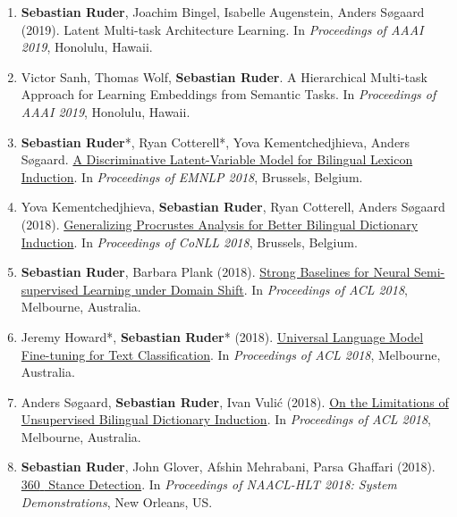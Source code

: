 \documentclass[10pt,letterpaper]{article}
\begin{document}
\begin{enumerate}
	\parskip=0.1em
	
	\item \textbf{Sebastian Ruder}, Joachim Bingel, Isabelle Augenstein, Anders Søgaard (2019). Latent Multi-task Architecture Learning. In \textit{Proceedings of AAAI 2019}, Honolulu, Hawaii.
	
	\item Victor Sanh, Thomas Wolf, \textbf{Sebastian Ruder}. A Hierarchical Multi-task Approach for Learning Embeddings from Semantic Tasks. In \textit{Proceedings of AAAI 2019}, Honolulu, Hawaii.
	
	\item \textbf{Sebastian Ruder}*, Ryan Cotterell*, Yova Kementchedjhieva, Anders Søgaard. \href{https://arxiv.org/abs/1808.09334}{A Discriminative Latent-Variable Model for Bilingual Lexicon Induction}. In \textit{Proceedings of EMNLP 2018}, Brussels, Belgium.

	\item Yova Kementchedjhieva, \textbf{Sebastian Ruder}, Ryan Cotterell, Anders Søgaard (2018). \href{https://arxiv.org/abs/1809.00064}{Generalizing Procrustes Analysis for Better Bilingual Dictionary Induction}. In \textit{Proceedings of CoNLL 2018}, Brussels, Belgium.
	
	\item \textbf{Sebastian Ruder}, Barbara Plank (2018). \href{https://arxiv.org/abs/1804.09530}{Strong Baselines for Neural Semi-supervised Learning under Domain Shift}. In \textit{Proceedings of ACL 2018}, Melbourne, Australia.

	\item Jeremy Howard*, \textbf{Sebastian Ruder}* (2018). \href{https://arxiv.org/abs/1801.06146}{Universal Language Model Fine-tuning for Text Classification}. In \textit{Proceedings of ACL 2018}, Melbourne, Australia.

	\item Anders Søgaard, \textbf{Sebastian Ruder}, Ivan Vulić (2018). \href{https://arxiv.org/abs/1805.03620}{On the Limitations of Unsupervised Bilingual Dictionary Induction}. In \textit{Proceedings of ACL 2018}, Melbourne, Australia.
	
	\item \textbf{Sebastian Ruder}, John Glover, Afshin Mehrabani, Parsa Ghaffari (2018). \href{https://arxiv.org/abs/1804.00982}{360\textdegree $\!$ $\!$ Stance Detection}. In \textit{Proceedings of NAACL-HLT 2018: System Demonstrations}, New Orleans, US. 
	

\end{enumerate}
\end{document}
